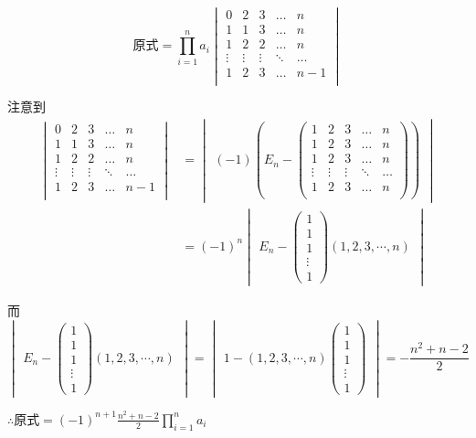 \begin{solution}
    $$
\text{原式}=\prod_{i=1}^na_i
\begin{vmatrix}
0&2&3&\ldots&n\\
1&1&3&\ldots&n\\
1&2&2&\ldots&n\\
\vdots&\vdots&\vdots&\ddots&\ldots\\
1&2&3&\ldots&n-1\\
\end{vmatrix}
$$

注意到
$$
\begin{aligned}
\begin{vmatrix}
0&2&3&\ldots&n\\
1&1&3&\ldots&n\\
1&2&2&\ldots&n\\
\vdots&\vdots&\vdots&\ddots&\ldots\\
1&2&3&\ldots&n-1\\
\end{vmatrix}&=\begin{vmatrix}(-1)\left(E_n-
\begin{pmatrix}
1&2&3&\ldots&n\\
1&2&3&\ldots&n\\
1&2&3&\ldots&n\\
\vdots&\vdots&\vdots&\ddots&\ldots\\
1&2&3&\ldots&n\\
\end{pmatrix}\right)\end{vmatrix}\\
&=(-1)^n\begin{vmatrix}E_n-
\begin{pmatrix}
1\\1\\1\\\vdots\\1
\end{pmatrix}(1, 2, 3, \cdots, n)\end{vmatrix}
\end{aligned}
$$

而
$$
\begin{vmatrix}E_n-
\begin{pmatrix}
1\\1\\1\\\vdots\\1
\end{pmatrix}(1, 2, 3, \cdots, n)\end{vmatrix}
=\begin{vmatrix}1-
(1, 2, 3, \cdots, n)\begin{pmatrix}
1\\1\\1\\\vdots\\1
\end{pmatrix}\end{vmatrix}
=-\frac{n^2+n-2}{2}
$$

$\therefore$原式$\displaystyle=(-1)^{n+1}\frac{n^2+n-2}{2}\prod_{i=1}^na_i$
\end{solution}


